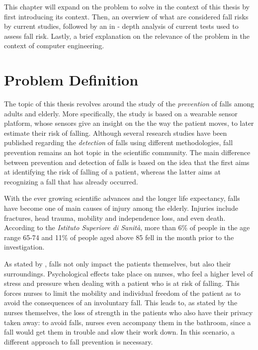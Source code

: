 
This chapter will expand on the problem to solve in the context of this thesis by first introducing its context. 
Then, an overwiew of what are considered fall risks by current studies, followed by an in - depth analysis of current tests used to assess fall risk.
Lastly, a brief explanation on the relevance of the problem in the context of computer engineering.


\section{Problem Definition}
The topic of this thesis revolves around the study of the \textit{prevention} of falls among adults and elderly. More specifically, the study is based on a wearable sensor platform, whose sensors give an insight on the the way the patient moves, to later estimate their risk of falling. 
Although several research studies have been published regarding the \textit{detection} of falls using different methodologies, fall prevention remains an hot topic in the scientific community. The main difference between prevention and detection of falls is based on the idea that the first aims at identifying the risk of falling of a patient, whereas the latter aims at recognizing a fall that has already occurred.

With the ever growing scientific advances and the longer life expectancy, falls have become one of main causes of injury among the elderly. 
Injuries include fractures, head trauma, mobility and independence loss, and even death. According to the \textit{Istituto Superiore di Sanità}, more than 6\% of people in the age range 65-74 and 11\% of people aged above 85 fell in the month prior to the investigation.

As stated by \cite{ImpactFallNurses}, falls not only impact the patients themselves, but also their surroundings. Psychological effects take place on nurses, who feel a higher level of stress and pressure when dealing with a patient who is at risk of falling. This forces nurses to limit the mobility and individual freedom of the patient as to avoid the consequences of an involuntary fall. This leads to, as stated by the nurses themselves, the loss of strength in the patients who also have their privacy taken away: to avoid falls, nurses even accompany them in the bathroom, since a fall would get them in trouble and slow their work down. 
In this scenario, a different approach to fall prevention is necessary.

